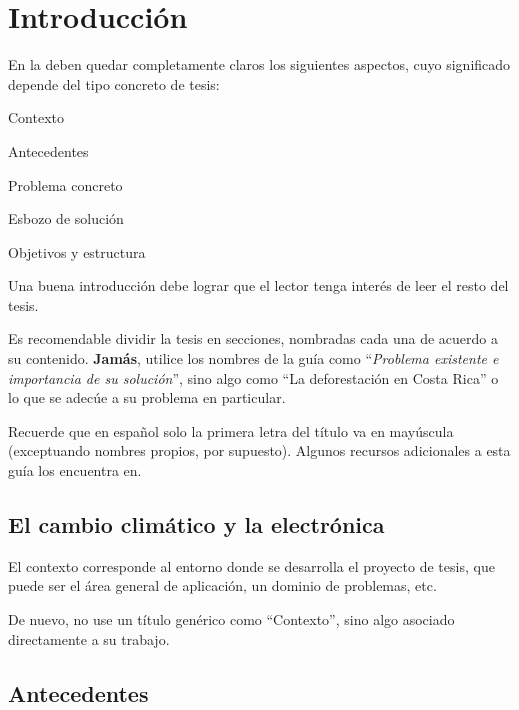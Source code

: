 
\chapter{Introducción}
\label{chp:intro}

En la  deben quedar completamente claros los siguientes
aspectos, cuyo significado depende del tipo concreto de tesis:

\begin{compactitem}
\item Contexto
\item Antecedentes
\item Problema concreto
\item Esbozo de solución
\item Objetivos y estructura
\end{compactitem}

Una buena introducción debe lograr que el lector tenga interés de leer el resto
del tesis.

Es recomendable dividir la tesis en secciones, nombradas cada una de acuerdo a
su contenido. \textbf{Jamás}, utilice los nombres de la guía como
``\emph{Problema existente e importancia de su solución}'', sino algo como ``La
deforestación en Costa Rica'' o lo que se adecúe a su problema en particular.

Recuerde que en español solo la primera letra del título va en mayúscula
(exceptuando nombres propios, por supuesto).
%
Algunos recursos adicionales a esta guía los encuentra en.


\section{El cambio climático y la electrónica}
\label{sec:contexto}

El contexto corresponde al entorno donde se desarrolla el proyecto de
tesis, que puede ser el área general de aplicación, un dominio de
problemas, etc.

De nuevo, no use un título genérico como ``Contexto'', sino algo
asociado directamente a su trabajo.


\section{Antecedentes}

